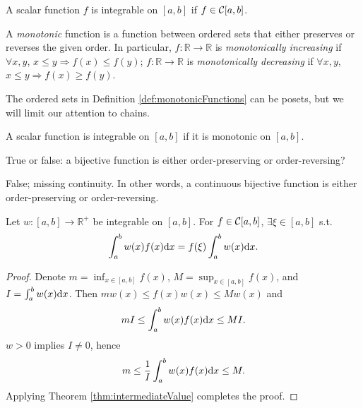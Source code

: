 \begin{thm}
  A scalar function $f$ is integrable on $[a, b]$
   if $f\in {\cal C}[a,b]$.
\end{thm}

\begin{defn}
  \label{def:monotonicFunctions}
  A \emph{monotonic} function is a function between ordered sets
   that either preserves or reverses the given order.
  In particular,
   $f:\mathbb{R}\rightarrow\mathbb{R}$
   is \emph{monotonically increasing}
   if $\forall x,y$, $x \le y \Rightarrow f(x)\le f(y)$;
   $f:\mathbb{R}\rightarrow\mathbb{R}$
   is \emph{monotonically decreasing}
   if $\forall x,y$, $x \le y \Rightarrow f(x)\ge f(y)$.
\end{defn}

\begin{rem}
  The ordered sets in Definition \ref{def:monotonicFunctions}
  can be posets,
  but we will limit our attention to chains.
\end{rem}

\begin{thm}
  A scalar function is integrable on $[a, b]$
   if it is monotonic on $[a, b]$.
\end{thm}

\begin{exc}
  True or false:
   a bijective function is either order-preserving
    or order-reversing?
\end{exc}
\begin{solution}
  False; missing continuity.
  In other words,
   a continuous bijective function is either order-preserving
    or order-reversing.
\end{solution}

\begin{thm}
  \label{thm:integralMeanValue}
  Let $w:[a,b]\rightarrow \mathbb{R}^+$
  be integrable on $[a,b]$. For $f\in {\cal C}[a,b]$,
  $\exists \xi\in[a,b]$ s.t.
  \begin{equation}
    \label{eq:integralMeanValue}
    \int_a^b w(x)f(x)\mathrm{d} x = f(\xi) \int_a^b w(x)\mathrm{d} x.
  \end{equation}
\end{thm}
\begin{proof}
  Denote $m=\inf_{x\in[a,b]} f(x)$, $M=\sup_{x\in[a,b]} f(x)$,
   and $I=\int_a^b w(x)\mathrm{d} x$.
  Then $m w(x)\le f(x)w(x) \le M w(x)$ and
  \begin{equation*}
    m I \le \int_a^b w(x) f(x) \mathrm{d} x \le M I.
  \end{equation*}
  $w>0$ implies $I\ne 0$, hence
  \begin{equation*}
    m \le \frac{1}{I}\int_a^b w(x) f(x) \mathrm{d} x \le M.
  \end{equation*}
  Applying Theorem \ref{thm:intermediateValue}
   completes the proof.
\end{proof}

